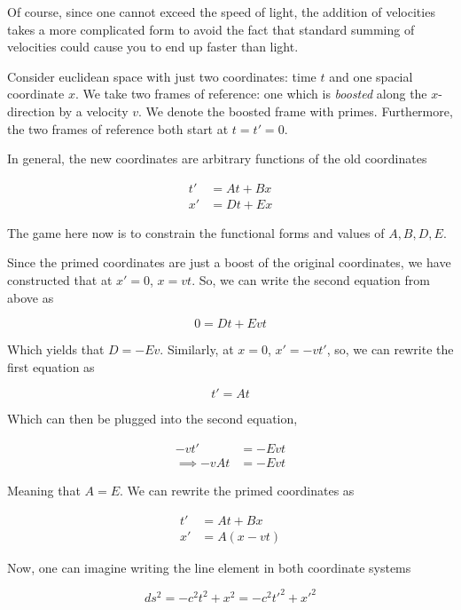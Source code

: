 \documentclass{article}
\begin{document}
Of course, since one cannot exceed the speed of light, the addition of velocities takes a more complicated form to avoid the fact that standard summing of velocities could cause you to end up faster than light.

Consider euclidean space with just two coordinates: time $t$ and one spacial coordinate $x$. We take two frames of reference: one which is \textit{boosted} along the $x$-direction by a velocity $v$. We denote the boosted frame with primes. Furthermore, the two frames of reference both start at $t=t'=0$.

In general, the new coordinates are arbitrary functions of the old coordinates

\begin{align}
    t' &= At + Bx \\
    x' &= Dt + Ex
\end{align}

The game here now is to constrain the functional forms and values of $A,B,D,E$.

Since the primed coordinates are just a boost of the original coordinates, we have constructed that at $x'=0$, $x=vt$. So, we can write the second equation from above as

\begin{equation}
    0 = Dt + Evt
\end{equation}

Which yields that $D = -Ev$. Similarly, at $x=0$, $x'=-vt'$, so, we can rewrite the first equation as

\begin{equation}
    t' = At
\end{equation}

Which can then be plugged into the second equation,

\begin{align}
    -vt' &= -Evt \\
    \implies -vAt &= -Evt
\end{align}

Meaning that $A = E$. We can rewrite the primed coordinates as

\begin{align}
    t' &= At + Bx \\
    x' &= A(x-vt)
\end{align}

Now, one can imagine writing the line element in both coordinate systems

\begin{equation}
    ds^2 = -c^2t^2 + x^2 = -c^2t'^2 + x'^2
\end{equation}
\end{document}
